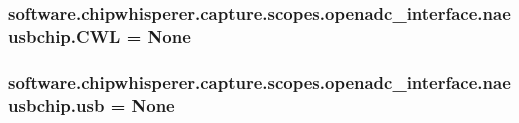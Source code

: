 \subsubsection[{C\+W\+L}]{\setlength{\rightskip}{0pt plus 5cm}software.\+chipwhisperer.\+capture.\+scopes.\+openadc\+\_\+interface.\+naeusbchip.\+C\+W\+L = None}\label{namespacesoftware_1_1chipwhisperer_1_1capture_1_1scopes_1_1openadc__interface_1_1naeusbchip_a6834c93edea5391aeff3f3f6b8198897}
\hypertarget{namespacesoftware_1_1chipwhisperer_1_1capture_1_1scopes_1_1openadc__interface_1_1naeusbchip_a7884c52956f0d1b5afb04bebea415951}{}
\subsubsection[{usb}]{\setlength{\rightskip}{0pt plus 5cm}software.\+chipwhisperer.\+capture.\+scopes.\+openadc\+\_\+interface.\+naeusbchip.\+usb = None}\label{namespacesoftware_1_1chipwhisperer_1_1capture_1_1scopes_1_1openadc__interface_1_1naeusbchip_a7884c52956f0d1b5afb04bebea415951}
